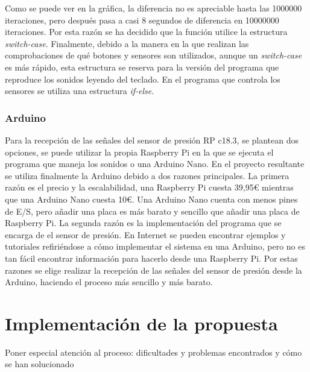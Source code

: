 \documentclass{article}
\begin{document}
    Como se puede ver en la gráfica, la diferencia no es apreciable hasta las 1000000 iteraciones, pero después
    pasa a casi 8 segundos de diferencia en 10000000 iteraciones. Por esta razón se ha decidido que la función
    utilice la estructura \textit{switch-case}.\newline
    Finalmente, debido a la manera en la que realizan las comprobaciones de qué botones y sensores son utilizados,
    aunque un \textit{switch-case} es más rápido, esta estructura se reserva para la versión del programa que
    reproduce los sonidos leyendo del teclado. En el programa que controla los sensores se utiliza una estructura
    \textit{if-else}.

    \subsubsection{Arduino}
    Para la recepción de las señales del sensor de presión RP c18.3, se plantean dos opciones, se puede utilizar
    la propia Raspberry Pi en la que se ejecuta el programa que maneja los sonidos o una Arduino Nano. En el
    proyecto resultante se utiliza finalmente la Arduino debido a dos razones principales.\newline
    La primera razón es el precio y la escalabilidad, una Raspberry Pi cuesta 39,95\euro{} mientras que una
    Arduino Nano cuesta 10\euro{}. Una Arduino Nano cuenta con menos pines de E/S, pero añadir una placa es más
    barato y sencillo que añadir una placa de Raspberry Pi.\newline
    La segunda razón es la implementación del programa que se encarga de el sensor de presión. En Internet se
    pueden encontrar ejemplos y tutoriales refiriéndose a cómo implementar el sistema en una Arduino, pero no
    es tan fácil encontrar información para hacerlo desde una Raspberry Pi.\newline
    Por estas razones se elige realizar la recepción de las señales del sensor de presión desde la Arduino,
    haciendo el proceso más sencillo y más barato.


\section{Implementación de la propuesta}\label{sec:Implementacion}

 Poner especial atención al proceso: dificultades y problemas encontrados y cómo se han solucionado
\end{document}

